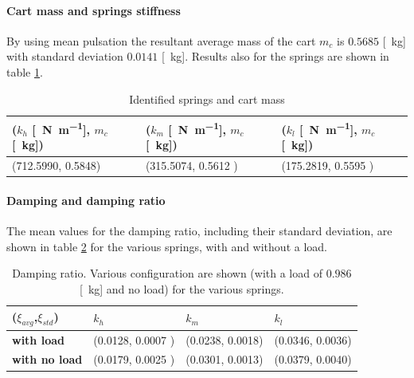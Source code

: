 \paragraph{Cart mass and springs stiffness}
By using   mean pulsation the resultant average mass of the cart $m_c$ is $0.5685$ [\SI{}{\kilo\gram}] with standard deviation $  0.0141$ [\SI{}{\kilo \gram}]. Results also for the springs are shown in table \ref{table: cart_springs_mass}.
\begin{table}[!h]
\centering
\label{table: cart_springs_mass}
\begin{tabular}{|l|l|l|}
\hline
{\textbf{($k_h$ [\SI{}{\newton \per \metre}], $m_c$ [\SI{}{\kilo \gram}])}} & \textbf{($k_m$ [\SI{}{\newton \per \metre}], $m_c$ [\SI{}{\kilo \gram}])} & \textbf{($k_l$ [\SI{}{\newton \per \metre}], $m_c$ [\SI{}{\kilo \gram}])} \\ \hline
(712.5990, 0.5848)              & (315.5074, 0.5612 )     & (175.2819, 0.5595 )     \\ \hline
\end{tabular}
\caption{Identified springs and cart mass}
\end{table}

\paragraph{Damping and damping ratio}
The mean values for the damping ratio, including their standard deviation, are shown in table \ref{table: cart_detached_dampingratio} for the various springs, with and without a load.
\begin{table}[!h]
\centering

\label{table: cart_detached_dampingratio}
\begin{tabular}{|l|l|l|l|}
\hline
{(\textbf{$\xi_{avg}$},$\xi_{std}$)} & \textbf{$k_h$} & \textbf{$k_m$}   & \textbf{$k_l$}   \\ \hline
\textbf{with load}         & (0.0128,  0.0007 )    & (0.0238, 0.0018) & (0.0346, 0.0036) \\ \hline
\textbf{with no load}      & (0.0179, 0.0025 )    & (0.0301, 0.0013) & (0.0379, 0.0040)      \\ \hline
\end{tabular}
\caption{Damping ratio. Various configuration are shown (with a load of $0.986$ [\SI{}{\kilo \gram}] and no load) for the various springs. }
\end{table}


